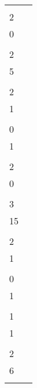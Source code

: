 \begin{minipage}{0.48\textwidth}
\begin{tabular}{ll}
{\begin{matrix}1 \\ 2 \\ 0 \\ \end{matrix}\,\, 
}\right]$ \\
$\sqrt[3]{14}$ & $\left[
\begin{matrix} \\ 2 \\ 5 \\ \end{matrix}\,\, 
\begin{matrix}1 \\ 2 \\ 1 \\ \end{matrix}\,\, 
\begin{matrix}2 \\ 0 \\ 1 \\ \end{matrix}\,\, 
\begin{matrix}1 \\ 2 \\ 0 \\ \end{matrix}\,\, 
\overline{
\begin{matrix}2 \\ 3 \\ 15 \\ \end{matrix}\,\, 
\begin{matrix}1 \\ 2 \\ 1 \\ \end{matrix}\,\, 
\begin{matrix}2 \\ 0 \\ 1 \\ \end{matrix}\,\, 
\begin{matrix}1 \\ 1 \\ 1 \\ \end{matrix}\,\, 
}\right]$ \\
$\sqrt[3]{15}$ & $\left[
\begin{matrix} \\ 2 \\ 6 \\ \end{matrix}\,\, 

\end{tabular}
\end{minipage}
